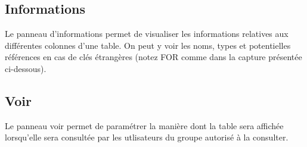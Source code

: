 \documentclass[letterpaper,10pt,french]{sphinxmanual}
\begin{document}


\subsection{Informations}
\label{tables/infopanel:informations}
Le panneau d'informations permet de visualiser les informations
relatives aux différentes colonnes d'une table. On peut y voir les
noms, types et potentielles références en cas de clés étrangères
(notez FOR comme dans la capture présentée ci-dessous).



\subsection{Voir}
\label{tables/infopanel:voir}
Le panneau voir permet de paramétrer la manière dont la table sera
affichée lorsqu'elle sera consultée par les utlisateurs du groupe
autorisé à la consulter.
\end{document}
